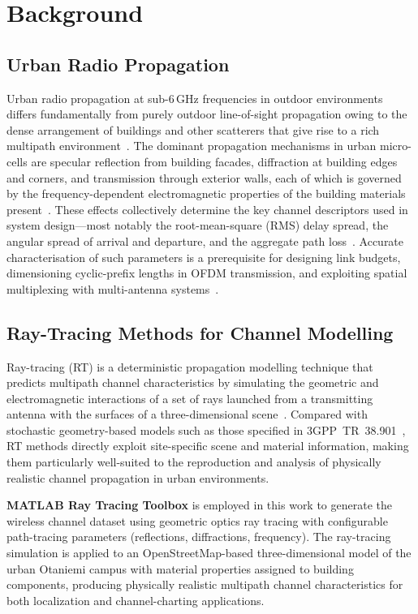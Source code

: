 \section{Background}
\label{sec:background}

\subsection{Urban Radio Propagation}

Urban radio propagation at sub-6\,GHz frequencies in outdoor environments differs
fundamentally from purely outdoor line-of-sight propagation owing to the dense
arrangement of buildings and other scatterers that give rise to a rich multipath
environment~\cite{rappaport2013millimeter}.
The dominant propagation mechanisms in urban micro-cells are specular reflection
from building facades, diffraction at building edges and corners, and transmission
through exterior walls, each of which is governed by the frequency-dependent
electromagnetic properties of the building materials present~\cite{itu_p2040}.
These effects collectively determine the key channel descriptors used in system
design---most notably the root-mean-square (RMS) delay spread, the angular spread of
arrival and departure, and the aggregate path loss~\cite{3gpp_nr_channel}.
Accurate characterisation of such parameters is a prerequisite for designing link
budgets, dimensioning cyclic-prefix lengths in OFDM transmission, and exploiting
spatial multiplexing with multi-antenna systems~\cite{dahlman2018_5gnr}.

\subsection{Ray-Tracing Methods for Channel Modelling}

Ray-tracing (RT) is a deterministic propagation modelling technique that predicts
multipath channel characteristics by simulating the geometric and electromagnetic
interactions of a set of rays launched from a transmitting antenna with the surfaces
of a three-dimensional scene~\cite{yun2015ray}.
Compared with stochastic geometry-based models such as those specified in
3GPP~TR~38.901~\cite{3gpp_nr_channel}, RT methods directly exploit site-specific
scene and material information, making them particularly well-suited to the
reproduction and analysis of physically realistic channel propagation in urban environments.

\textbf{MATLAB Ray Tracing Toolbox} is employed in this work to generate the wireless
channel dataset using geometric optics ray tracing with configurable path-tracing parameters
(reflections, diffractions, frequency). The ray-tracing simulation is applied to an
OpenStreetMap-based three-dimensional model of the urban Otaniemi campus with material
properties assigned to building components, producing physically realistic multipath
channel characteristics for both localization and channel-charting applications.

